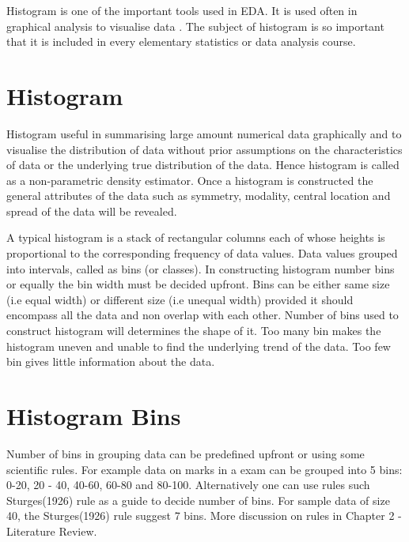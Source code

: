 Histogram is one of the important tools used in EDA. It is used often in graphical analysis to visualise data \cite[]{li2016essential}. The subject of histogram is so important that it is included in every elementary statistics or data analysis course. 

\section{Histogram}

Histogram useful in summarising large amount numerical data graphically \cite[]{kirschenmann2015note} and to visualise the distribution of data without prior assumptions on the characteristics of data or the underlying true distribution of the data. Hence histogram is called as a non-parametric density estimator\cite[]{keen2010graphics}. Once a histogram is constructed the general attributes of the data such as symmetry, modality, central location and spread of the data will be revealed.

A typical histogram is a stack of rectangular columns each of whose heights is proportional to the corresponding frequency of data values. Data values grouped into intervals, called as bins (or classes). In constructing histogram number bins or equally the bin width must be decided upfront. Bins can be either same size (i.e equal width) or different size (i.e unequal width) provided it should encompass all the data and non overlap with each other. Number of bins used to construct histogram will determines the shape of it. Too many bin makes the histogram uneven and unable to find the underlying trend of the data. Too few bin gives little information about the data. 

\section{Histogram Bins}

Number of bins in grouping data can be predefined upfront or using some scientific rules. For example data on marks in a exam can be grouped into 5 bins: 0-20, 20 - 40, 40-60, 60-80 and 80-100. Alternatively one can use rules such Sturges(1926) rule as a guide to decide number of bins. For sample data of size 40, the Sturges(1926) rule suggest 7 bins. More discussion on rules in Chapter 2 - Literature Review.



